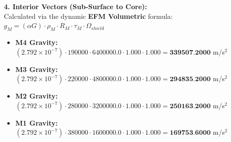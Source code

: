 \documentclass[11pt, a4paper]{article}
\begin{document}
  \vspace{0.5em}
  \noindent \textbf{4. Interior Vectors (Sub-Surface to Core):} \\[0.5em]
  \hspace*{1em} Calculated via the dynamic \textbf{EFM Volumetric} formula: $g_M = (\alpha G) \cdot \rho_{M} \cdot R_M \cdot \tau_M \cdot \Omega_{shield}$
  \begin{itemize}
    \item \textbf{M4 Gravity:} $(2.792 \times 10^{-7}) \cdot 190000 \cdot 6400000.0 \cdot 1.000 \cdot 1.000 = \textbf{339507.2000}$ m/s$^2$
    \item \textbf{M3 Gravity:} $(2.792 \times 10^{-7}) \cdot 220000 \cdot 4800000.0 \cdot 1.000 \cdot 1.000 = \textbf{294835.2000}$ m/s$^2$
    \item \textbf{M2 Gravity:} $(2.792 \times 10^{-7}) \cdot 280000 \cdot 3200000.0 \cdot 1.000 \cdot 1.000 = \textbf{250163.2000}$ m/s$^2$
    \item \textbf{M1 Gravity:} $(2.792 \times 10^{-7}) \cdot 380000 \cdot 1600000.0 \cdot 1.000 \cdot 1.000 = \textbf{169753.6000}$ m/s$^2$
  \end{itemize}
\end{document}
